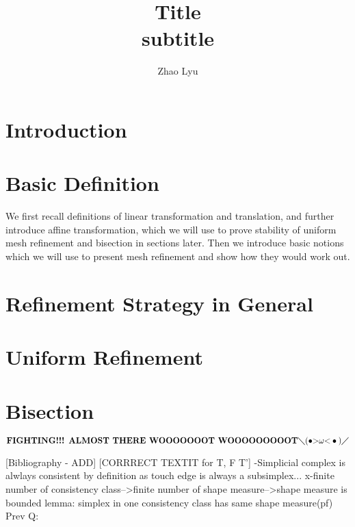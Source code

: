 \documentclass{article}
\title{\textbf{Title} \\subtitle}
\author{Zhao Lyu}
\begin{document}
  \doublespacing %
  \maketitle
  \singlespacing

  \newpage %
  \tableofcontents
  \newpage

  \section{Introduction}
  
  \newpage

  \section{Basic Definition}
    We first recall definitions of linear transformation and translation, and further introduce affine transformation, which we will use to prove stability of uniform mesh refinement and bisection in sections later. Then we introduce basic notions which we will use to present mesh refinement and show how they would work out.

    
    
    
    


  \section{Refinement Strategy in General}
    

  \section{Uniform Refinement}
    

  \section{Bisection}

  \newpage
  
  

    \newpage
    $\textbf{FIGHTING!!! ALMOST THERE WOOOOOOOT WOOOOOOOOOT}  \diagdown{(\bullet{ > }\omega{ < }\bullet{})} \diagup{}$


    [Bibliography - ADD]
    [CORRRECT TEXTIT for T, F T']
    -Simplicial complex is alwlays consistent by definition as touch edge is always a subsimplex...
    x-finite number of consistency class-->finite number of shape measure-->shape measure is bounded
    lemma: simplex in one consistency class has same shape measure(pf)
    \newpage
    Prev Q:\\
    
\end{document}
